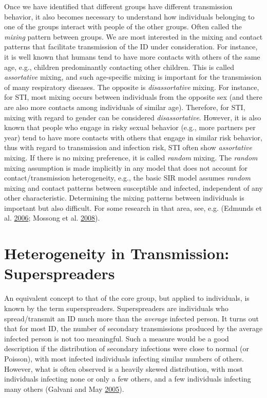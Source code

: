 \documentclass[]{book}
\theoremstyle{definition}
\theoremstyle{definition}
\theoremstyle{definition}
\theoremstyle{remark}
\begin{document}
Once we have identified that different groups have different
transmission behavior, it also becomes necessary to understand how
individuals belonging to one of the groups interact with people of the
other groups. Often called the \emph{mixing} pattern between groups. We
are most interested in the mixing and contact patterns that facilitate
transmission of the ID under consideration. For instance, it is well
known that humans tend to have more contacts with others of the same
age, e.g., children predominantly contacting other children. This is
called \emph{assortative} mixing, and such age-specific mixing is
important for the transmission of many respiratory diseases. The
opposite is \emph{disassortative} mixing. For instance, for STI, most
mixing occurs between individuals from the opposite sex (and there are
also more contacts among individuals of similar age). Therefore, for
STI, mixing with regard to gender can be considered
\emph{disassortative}. However, it is also known that people who engage
in risky sexual behavior (e.g., more partners per year) tend to have
more contacts with others that engage in similar risk behavior, thus
with regard to transmission and infection risk, STI often show
\emph{assortative} mixing. If there is no mixing preference, it is
called \emph{random} mixing. The \emph{random} mixing assumption is made
implicitly in any model that does not account for contact/transmission
heterogeneity, e.g., the basic SIR model assumes \emph{random} mixing
and contact patterns between susceptible and infected, independent of
any other characteristic. Determining the mixing patterns between
individuals is important but also difficult. For some research in that
area, see, e.g. (Edmunds et al. \protect\hyperlink{ref-edmunds06}{2006};
Mossong et al. \protect\hyperlink{ref-mossong08}{2008}).

\section{Heterogeneity in Transmission:
Superspreaders}\label{heterogeneity-in-transmission-superspreaders}

An equivalent concept to that of the core group, but applied to
individuals, is known by the term superspreaders. Superspreaders are
individuals who spread/transmit an ID much more than the \emph{average}
infected person. It turns out that for most ID, the number of secondary
transmissions produced by the average infected person is not too
meaningful. Such a measure would be a good description if the
distribution of secondary infections were close to normal (or Poisson),
with most infected individuals infecting similar numbers of others.
However, what is often observed is a heavily skewed distribution, with
most individuals infecting none or only a few others, and a few
individuals infecting many others (Galvani and May
\protect\hyperlink{ref-galvani05}{2005}).
\end{document}
